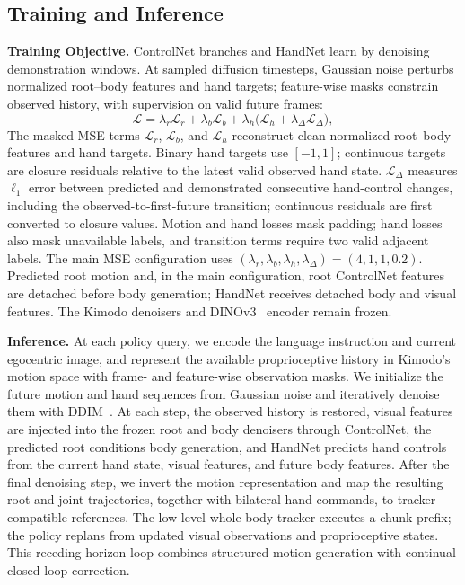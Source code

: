 \subsection{Training and Inference}
\label{sec:training_inference}

\textbf{Training Objective.} ControlNet branches and HandNet learn by denoising demonstration windows. At sampled diffusion timesteps, Gaussian noise perturbs normalized root--body features and hand targets; feature-wise masks constrain observed history, with supervision on valid future frames:
\begin{equation}
  \mathcal{L}=\lambda_r\mathcal{L}_{r}+\lambda_b\mathcal{L}_{b}
  +\lambda_h\bigl(\mathcal{L}_{h}+\lambda_{\Delta}\mathcal{L}_{\Delta}\bigr),
  \label{eq:policy_training_objective}
\end{equation}
The masked MSE terms $\mathcal{L}_{r}$, $\mathcal{L}_{b}$, and $\mathcal{L}_{h}$ reconstruct clean normalized root--body features and hand targets. Binary hand targets use $[-1,1]$; continuous targets are closure residuals relative to the latest valid observed hand state. $\mathcal{L}_{\Delta}$ measures $\ell_1$ error between predicted and demonstrated consecutive hand-control changes, including the observed-to-first-future transition; continuous residuals are first converted to closure values. Motion and hand losses mask padding; hand losses also mask unavailable labels, and transition terms require two valid adjacent labels. The main MSE configuration uses $(\lambda_r,\lambda_b,\lambda_h,\lambda_{\Delta})=(4,1,1,0.2)$. Predicted root motion and, in the main configuration, root ControlNet features are detached before body generation; HandNet receives detached body and visual features. The Kimodo denoisers and DINOv3~\cite{dinov3} encoder remain frozen.

\textbf{Inference.} At each policy query, we encode the language instruction and current egocentric image, and represent the available proprioceptive history in Kimodo's motion space with frame- and feature-wise observation masks. We initialize the future motion and hand sequences from Gaussian noise and iteratively denoise them with DDIM~\cite{song2022denoisingdiffusionimplicitmodels}. At each step, the observed history is restored, visual features are injected into the frozen root and body denoisers through ControlNet, the predicted root conditions body generation, and HandNet predicts hand controls from the current hand state, visual features, and future body features. After the final denoising step, we invert the motion representation and map the resulting root and joint trajectories, together with bilateral hand commands, to tracker-compatible references. The low-level whole-body tracker executes a chunk prefix; the policy replans from updated visual observations and proprioceptive states. This receding-horizon loop combines structured motion generation with continual closed-loop correction.
